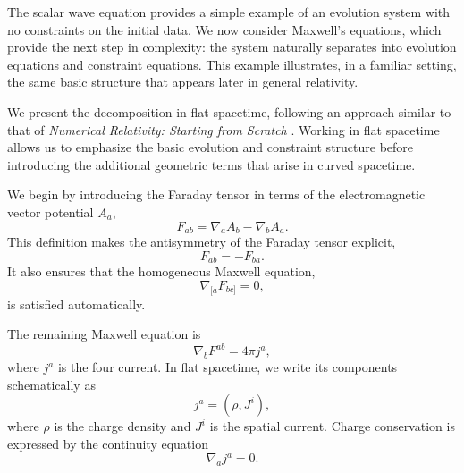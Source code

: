 The scalar wave equation provides a simple example of an evolution system with no constraints on the initial data. We now consider Maxwell's equations, which provide the next step in complexity: the system naturally separates into evolution equations and constraint equations. This example illustrates, in a familiar setting, the same basic structure that appears later in general relativity.

We present the decomposition in flat spacetime, following an approach similar to that of \textit{Numerical Relativity: Starting from Scratch} \cite{BaumgarteShapiro2021}. Working in flat spacetime allows us to emphasize the basic evolution and constraint structure before introducing the additional geometric terms that arise in curved spacetime.

We begin by introducing the Faraday tensor in terms of the electromagnetic vector potential $A_a$,
\begin{equation}
F_{ab} = \nabla_a A_b - \nabla_b A_a .
\end{equation}
This definition makes the antisymmetry of the Faraday tensor explicit,
\begin{equation}
F_{ab} = -F_{ba}.
\end{equation}
It also ensures that the homogeneous Maxwell equation,
\begin{equation}
\nabla_{[a}F_{bc]}=0 ,
\end{equation}
is satisfied automatically.

The remaining Maxwell equation is
\begin{equation}
\nabla_b F^{ab} = 4\pi j^a ,
\label{eq:maxwell_equation}
\end{equation}
where $j^a$ is the four current. In flat spacetime, we write its components schematically as
\begin{equation}
j^a = (\rho,J^i),
\end{equation}
where $\rho$ is the charge density and $J^i$ is the spatial current. Charge conservation is expressed by the continuity equation
\begin{equation}
\nabla_a j^a = 0 .
\end{equation}


